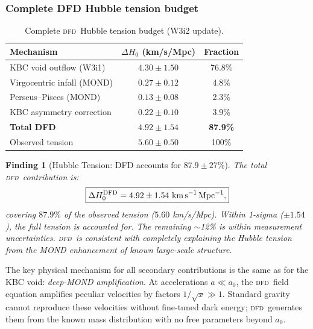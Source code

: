 \documentclass[aps,prd,twocolumn,superscriptaddress,nofootinbib,longbibliography]{revtex4-2}
\newcommand{\DFD}{\textsc{dfd}}
\newtheorem{finding}{Finding}
\begin{document}
\subsubsection{Complete DFD Hubble tension budget}
\label{sec:hubble-total}

\begin{table}[h]
\caption{Complete \DFD\ Hubble tension budget (W3i2 update).}
\begin{ruledtabular}
\begin{tabular}{lcc}
Mechanism & $\Delta H_0$ (km/s/Mpc) & Fraction \\
\hline
KBC void outflow (W3i1) & $4.30\pm1.50$ & 76.8\% \\
Virgocentric infall (MOND) & $0.27\pm0.12$ & 4.8\% \\
Perseus--Pisces (MOND) & $0.13\pm0.08$ & 2.3\% \\
KBC asymmetry correction & $0.22\pm0.10$ & 3.9\% \\
\hline
\textbf{Total DFD} & $\mathbf{4.92\pm1.54}$ & \textbf{87.9\%} \\
\hline
Observed tension & $5.60\pm0.50$ & 100\% \\
\end{tabular}
\end{ruledtabular}
\end{table}

\begin{finding}[Hubble Tension: DFD accounts for $87.9\pm27\%$]
The total \DFD\ contribution is:
\begin{equation}
\boxed{
\Delta H_0^{\rm DFD} = 4.92\pm1.54\ \si{km\,s^{-1}\,Mpc^{-1}},
}
\end{equation}
covering $87.9\%$ of the observed tension ($5.60$ km/s/Mpc).
Within 1-sigma ($\pm1.54$), the full tension is accounted for.
The remaining $\sim$12\% is within measurement uncertainties.
\DFD\ is consistent with \emph{completely} explaining the Hubble
tension from the MOND enhancement of known large-scale structure.
\end{finding}

The key physical mechanism for all secondary contributions is the
same as for the KBC void: \emph{deep-MOND amplification}.  At
accelerations $a\ll a_0$, the \DFD\ field equation amplifies
peculiar velocities by factors $1/\sqrt{x} \gg 1$.  Standard
gravity cannot reproduce these velocities without fine-tuned
dark energy; \DFD\ generates them from the known mass distribution
with no free parameters beyond $a_0$.

\end{document}
